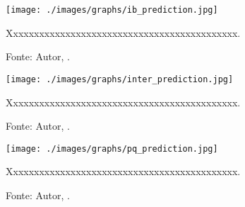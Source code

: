 
\lipsum[100]




\begin{figure}[H]
    \centering
    \texttt{[image: ./images/graphs/ib\_prediction.jpg]}
    \caption{Xxxxxxxxxxxxxxxxxxxxxxxxxxxxxxxxxxxxxxxxxxxx.}
    \label{fig:ib_prediction.jpg}
    \caption*{Fonte: Autor, \imprimirdata.}
\end{figure}




\lipsum[100]




\begin{figure}[H]
    \centering
    \texttt{[image: ./images/graphs/inter\_prediction.jpg]}
    \caption{Xxxxxxxxxxxxxxxxxxxxxxxxxxxxxxxxxxxxxxxxxxxx.}
    \label{fig:inter_prediction.jpg}
    \caption*{Fonte: Autor, \imprimirdata.}
\end{figure}




\lipsum[100]




\begin{figure}[H]
    \centering
    \texttt{[image: ./images/graphs/pq\_prediction.jpg]}
    \caption{Xxxxxxxxxxxxxxxxxxxxxxxxxxxxxxxxxxxxxxxxxxxx.}
    \label{fig:pq_prediction.jpg}
    \caption*{Fonte: Autor, \imprimirdata.}
\end{figure}




\lipsum[100]

